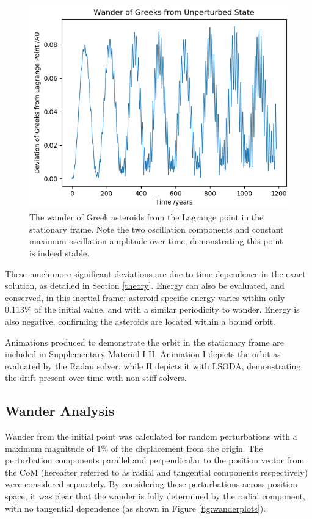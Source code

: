 \documentclass[11pt, a4paper,twocolumn]{article} %
\begin{document}
\begin{figure}
	\centering
	\includegraphics[width=\linewidth]{Figures/greeks_deviation_stationary_frame}
	\caption{The wander of Greek asteroids from the Lagrange point in the stationary frame. Note the two oscillation components and constant maximum oscillation amplitude over time, demonstrating this point is indeed stable.}
	\label{fig:greeksdeviationstationaryframe}
\end{figure}

These much more significant deviations are due to time-dependence in the exact solution, as detailed in Section \ref{theory}. Energy can also be evaluated, and conserved, in this inertial frame; asteroid specific energy varies within only 0.113\% of the initial value, and with a similar periodicity to wander. Energy is also negative, confirming the asteroids are located within a bound orbit.

Animations produced to demonstrate the orbit in the stationary frame are included in Supplementary Material I-II. Animation I depicts the orbit as evaluated by the Radau solver, while II depicts it with LSODA, demonstrating the drift present over time with non-stiff solvers.

\subsection{Wander Analysis} \label{perturbed}
Wander from the initial point was calculated for random perturbations with a maximum magnitude of 1\% of the displacement from the origin. The perturbation components parallel and perpendicular to the position vector from the CoM (hereafter referred to as radial and tangential components respectively) were considered separately. By considering these perturbations across position space, it was clear that the wander is fully determined by the radial component, with no tangential dependence (as shown in Figure \ref{fig:wanderplots}).
\end{document}
